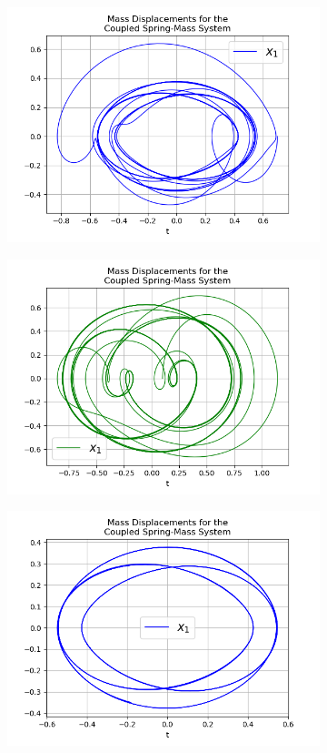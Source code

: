 \documentclass{article}
\begin{document}
\begin{figure}[h!]
\begin{subfigure}[b]{0.45\linewidth}
    \includegraphics[width=\linewidth]{two_springs413.png}
    \caption{}
  \end{subfigure}
  \begin{subfigure}[b]{0.45\linewidth}
    \includegraphics[width=\linewidth]{two_springs414.png}
    \caption{}
  \end{subfigure}
  \begin{subfigure}[b]{0.45\linewidth}
    \includegraphics[width=\linewidth]{two_springs415.png}

\end{subfigure}
\end{figure}
\end{document}
